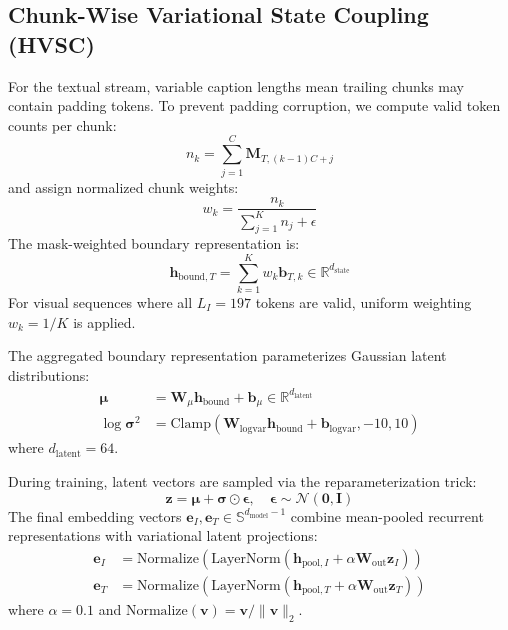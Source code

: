 \documentclass[journal]{IEEEtran}
\begin{document}
\subsection{Chunk-Wise Variational State Coupling (HVSC)}
For the textual stream, variable caption lengths mean trailing chunks may contain padding tokens. To prevent padding corruption, we compute valid token counts per chunk:
\begin{equation}
n_k = \sum_{j=1}^C \mathbf{M}_{T, (k-1)C + j}
\end{equation}
and assign normalized chunk weights:
\begin{equation}
w_k = \frac{n_k}{\sum_{j=1}^K n_j + \epsilon}
\end{equation}
The mask-weighted boundary representation is:
\begin{equation}
\mathbf{h}_{\text{bound}, T} = \sum_{k=1}^K w_k \mathbf{b}_{T, k} \in \mathbb{R}^{d_{\text{state}}}
\end{equation}
For visual sequences where all $L_I=197$ tokens are valid, uniform weighting $w_k = 1/K$ is applied.

The aggregated boundary representation parameterizes Gaussian latent distributions:
\begin{align}
\boldsymbol{\mu} &= \mathbf{W}_\mu \mathbf{h}_{\text{bound}} + \mathbf{b}_\mu \in \mathbb{R}^{d_{\text{latent}}} \\
\log \boldsymbol{\sigma}^2 &= \text{Clamp}\left(\mathbf{W}_{\text{logvar}} \mathbf{h}_{\text{bound}} + \mathbf{b}_{\text{logvar}}, -10, 10\right)
\end{align}
where $d_{\text{latent}}=64$.

During training, latent vectors are sampled via the reparameterization trick:
\begin{equation}
\mathbf{z} = \boldsymbol{\mu} + \boldsymbol{\sigma} \odot \boldsymbol{\epsilon}, \quad \boldsymbol{\epsilon} \sim \mathcal{N}(\mathbf{0}, \mathbf{I})
\end{equation}
The final embedding vectors $\mathbf{e}_I, \mathbf{e}_T \in \mathbb{S}^{d_{\text{model}}-1}$ combine mean-pooled recurrent representations with variational latent projections:
\begin{align}
\mathbf{e}_I &= \text{Normalize}\left( \text{LayerNorm}(\mathbf{h}_{\text{pool}, I} + \alpha \mathbf{W}_{\text{out}} \mathbf{z}_I) \right) \\
\mathbf{e}_T &= \text{Normalize}\left( \text{LayerNorm}(\mathbf{h}_{\text{pool}, T} + \alpha \mathbf{W}_{\text{out}} \mathbf{z}_T) \right)
\end{align}
where $\alpha = 0.1$ and $\text{Normalize}(\mathbf{v}) = \mathbf{v} / \|\mathbf{v}\|_2$.
\end{document}
